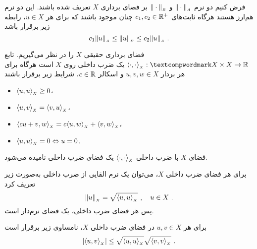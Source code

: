 \begin{definition}
فرض کنیم دو نرم
$\normS{A}{\cdot}$
و
$\normS{B}{\cdot}$
بر فضای برداری
$X$
تعریف شده باشند.
این دو نرم هم‌ارز هستند هرگاه ثابت‌های
$c_{1}, c_{2} \in \RealP$
چنان موجود باشند که برای هر
$u \in X$،
رابطه زیر برقرار باشد
\begin{equation*}
c_{1} \normS{A}{u} \leq \normS{B}{u} \leq c_{2} \normS{A}{u}
\sdn
\end{equation*}
\end{definition}

\begin{definition}
فضای برداری حقیقی
$X$
را در نظر می‌گیریم.
تابع
$\innerS{X}{\cdot}{\cdot} :‌ X \times X \to \Real$
یک ضرب داخلی روی
$X$
است هرگاه برای هر بردار
$u,v,w \in X$
و اسکالر
$c \in \Real$،
شرایط زیر برقرار باشند
\begin{itemize}
\item
$\innerS{X}{u}{u} \geq 0$،
\item
$\innerS{X}{u}{v} = \innerS{X}{v}{u}$،
\item
$\innerS{X}{c u + v}{w} = c \innerS{X}{u}{w} + \innerS{X}{v}{w}$،
\item
$\innerS{X}{u}{u} = 0 \Leftrightarrow u = 0$.
\end{itemize}
فضای
$X$
با ضرب داخلی
$\innerS{X}{\cdot}{\cdot}$
یک فضای ضرب داخلی نامیده می‌شود.
\end{definition}

\begin{note}
برای هر فضای ضرب داخلی
$X$،
می‌توان یک نرم القایی از ضرب داخلی به‌صورت زیر تعریف کرد
\begin{equation*}
\normS{X}{u} = \sqrt{\innerS{X}{u}{u}}
\sqq
u \in X
\sdn
\end{equation*}
پس هر فضای ضرب داخلی،‌ یک فضای نرم‌دار است.
\end{note}

\begin{theorem}
 برای هر
$u,v \in X$
در فضای ضرب داخلی
$X$،
نامساوی زیر برقرار است
\begin{equation*}
\abs{ \innerS{X}{u}{v} } \leq \sqrt{ \innerS{X}{u}{u} } \sqrt{ \innerS{X}{v}{v} }
\sdn
\end{equation*}
\end{theorem}

